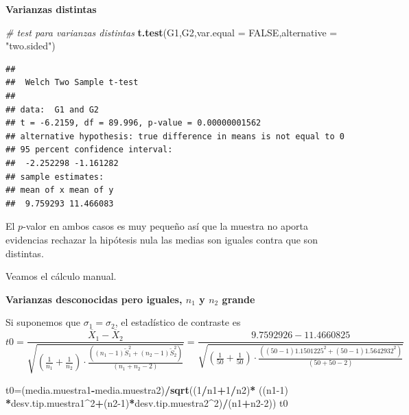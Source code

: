 \documentclass[
]{article}
\newenvironment{Shaded}{\begin{snugshade}}{\end{snugshade}}
\newcommand{\CommentTok}[1]{\textcolor[rgb]{0.56,0.35,0.01}{\textit{#1}}}
\newcommand{\DataTypeTok}[1]{\textcolor[rgb]{0.13,0.29,0.53}{#1}}
\newcommand{\DecValTok}[1]{\textcolor[rgb]{0.00,0.00,0.81}{#1}}
\newcommand{\KeywordTok}[1]{\textcolor[rgb]{0.13,0.29,0.53}{\textbf{#1}}}
\newcommand{\NormalTok}[1]{#1}
\newcommand{\OperatorTok}[1]{\textcolor[rgb]{0.81,0.36,0.00}{\textbf{#1}}}
\newcommand{\OtherTok}[1]{\textcolor[rgb]{0.56,0.35,0.01}{#1}}
\newcommand{\StringTok}[1]{\textcolor[rgb]{0.31,0.60,0.02}{#1}}
\begin{document}
\textbf{Varianzas distintas}

\begin{Shaded}
\begin{Highlighting}[]
\CommentTok{\# test para varianzas distintas}
\KeywordTok{t.test}\NormalTok{(G1,G2,}\DataTypeTok{var.equal =} \OtherTok{FALSE}\NormalTok{,}\DataTypeTok{alternative =} \StringTok{"two.sided"}\NormalTok{)}
\end{Highlighting}
\end{Shaded}

\begin{verbatim}
## 
##  Welch Two Sample t-test
## 
## data:  G1 and G2
## t = -6.2159, df = 89.996, p-value = 0.00000001562
## alternative hypothesis: true difference in means is not equal to 0
## 95 percent confidence interval:
##  -2.252298 -1.161282
## sample estimates:
## mean of x mean of y 
##  9.759293 11.466083
\end{verbatim}

El \(p\)-valor en ambos casos es muy pequeño así que la muestra no
aporta evidencias rechazar la hipótesis nula las medias son iguales
contra que son distintas.

Veamos el cálculo manual.

\textbf{Varianzas desconocidas pero iguales, \(n_1\) y \(n_2\) grande}

Si suponemos que \(\sigma_1=\sigma_2\), el estadístico de contraste es
\[
t0=\frac{\overline{X}_1-\overline{X}_2}
{\sqrt{(\frac1{n_1}+\frac1{n_2})\cdot 
\frac{((n_1-1)\widetilde{S}_1^2+(n_2-1)\widetilde{S}_2^2)}
{(n_1+n_2-2)}}}=\frac{9.7592926-11.4660825}
{\sqrt{(\frac1{50}+\frac1{50})\cdot 
\frac{((50-1) 1.1501225^2+(50-1)1.5642932^2)}
{(50+50-2)}}}
\]

\begin{Shaded}
\begin{Highlighting}[]
\NormalTok{t0=(media.muestra1}\OperatorTok{{-}}\NormalTok{media.muestra2)}\OperatorTok{/}\KeywordTok{sqrt}\NormalTok{((}\DecValTok{1}\OperatorTok{/}\NormalTok{n1}\OperatorTok{+}\DecValTok{1}\OperatorTok{/}\NormalTok{n2)}\OperatorTok{*}\StringTok{ }
\NormalTok{((n1}\DecValTok{{-}1}\NormalTok{) }\OperatorTok{*}\NormalTok{desv.tip.muestra1}\OperatorTok{\^{}}\DecValTok{2}\OperatorTok{+}\NormalTok{(n2}\DecValTok{{-}1}\NormalTok{)}\OperatorTok{*}\NormalTok{desv.tip.muestra2}\OperatorTok{\^{}}\DecValTok{2}\NormalTok{)}\OperatorTok{/}\NormalTok{(n1}\OperatorTok{+}\NormalTok{n2}\DecValTok{{-}2}\NormalTok{))}
\NormalTok{t0}
\end{Highlighting}
\end{Shaded}
\end{document}
